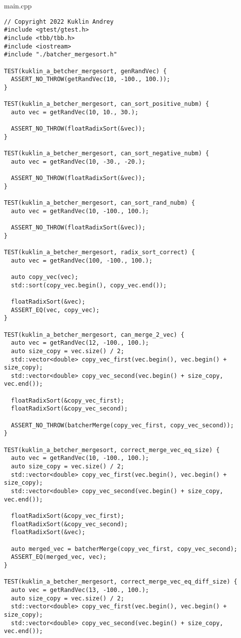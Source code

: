 \documentclass{report}
\begin{document}
\par main.cpp
\begin{lstlisting}
// Copyright 2022 Kuklin Andrey
#include <gtest/gtest.h>
#include <tbb/tbb.h>
#include <iostream>
#include "./batcher_mergesort.h"

TEST(kuklin_a_betcher_mergesort, genRandVec) {
  ASSERT_NO_THROW(getRandVec(10, -100., 100.));
}

TEST(kuklin_a_betcher_mergesort, can_sort_positive_nubm) {
  auto vec = getRandVec(10, 10., 30.);

  ASSERT_NO_THROW(floatRadixSort(&vec));
}

TEST(kuklin_a_betcher_mergesort, can_sort_negative_nubm) {
  auto vec = getRandVec(10, -30., -20.);

  ASSERT_NO_THROW(floatRadixSort(&vec));
}

TEST(kuklin_a_betcher_mergesort, can_sort_rand_nubm) {
  auto vec = getRandVec(10, -100., 100.);

  ASSERT_NO_THROW(floatRadixSort(&vec));
}

TEST(kuklin_a_betcher_mergesort, radix_sort_correct) {
  auto vec = getRandVec(100, -100., 100.);

  auto copy_vec(vec);
  std::sort(copy_vec.begin(), copy_vec.end());

  floatRadixSort(&vec);
  ASSERT_EQ(vec, copy_vec);
}

TEST(kuklin_a_betcher_mergesort, can_merge_2_vec) {
  auto vec = getRandVec(12, -100., 100.);
  auto size_copy = vec.size() / 2;
  std::vector<double> copy_vec_first(vec.begin(), vec.begin() + size_copy);
  std::vector<double> copy_vec_second(vec.begin() + size_copy, vec.end());

  floatRadixSort(&copy_vec_first);
  floatRadixSort(&copy_vec_second);

  ASSERT_NO_THROW(batcherMerge(copy_vec_first, copy_vec_second));
}

TEST(kuklin_a_betcher_mergesort, correct_merge_vec_eq_size) {
  auto vec = getRandVec(10, -100., 100.);
  auto size_copy = vec.size() / 2;
  std::vector<double> copy_vec_first(vec.begin(), vec.begin() + size_copy);
  std::vector<double> copy_vec_second(vec.begin() + size_copy, vec.end());

  floatRadixSort(&copy_vec_first);
  floatRadixSort(&copy_vec_second);
  floatRadixSort(&vec);

  auto merged_vec = batcherMerge(copy_vec_first, copy_vec_second);
  ASSERT_EQ(merged_vec, vec);
}

TEST(kuklin_a_betcher_mergesort, correct_merge_vec_eq_diff_size) {
  auto vec = getRandVec(13, -100., 100.);
  auto size_copy = vec.size() / 2;
  std::vector<double> copy_vec_first(vec.begin(), vec.begin() + size_copy);
  std::vector<double> copy_vec_second(vec.begin() + size_copy, vec.end());


\end{lstlisting}
\end{document}

